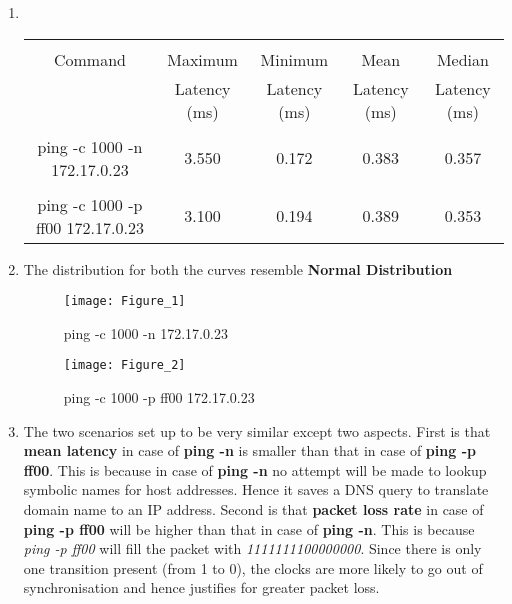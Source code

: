 \documentclass[12pt]{report}
\begin{document}
\begin{enumerate}[label=\textbf{(\alph*)}]
\begin{center}
\begin{tabular}{| c | c | c | c |}
		\end{tabular}
		\\[10pt]
		\end{center}
		\vspace*{2cm}
		\item \textbf{}\\
		\begin{center}
			\begin{tabular}{| c | c | c | c | c |}
				\hline
				&&&&\\[2pt]
				Command & Maximum & Minimum & Mean & Median \\
				&Latency (ms)&Latency (ms)&Latency (ms)&Latency (ms)\\[2pt]
				\hline
				&&&&\\[2pt]
				ping -c 1000 -n 172.17.0.23 & 3.550 & 0.172 & 0.383 & 0.357 \\[2pt]
				\hline
				&&&&\\[2pt]
				ping -c 1000 -p ff00 172.17.0.23 & 3.100 & 0.194 & 0.389 & 0.353 \\[2pt]
				\hline	
			\end{tabular}
		\end{center}
		\pagebreak
		\vspace*{10px}
		\item The distribution for both the curves resemble \textbf{Normal Distribution}\\[1mm]
		\begin{figure}[H]
			\centering
			\texttt{[image: Figure\_1]}
			\caption{ping -c 1000 -n 172.17.0.23}
		\end{figure}
		\begin{figure}[H]
			\centering
			\texttt{[image: Figure\_2]}
			\caption{ping -c 1000 -p ff00 172.17.0.23}
		\end{figure}
		\item The two scenarios set up to be very similar except two aspects. First is that \textbf{mean latency} in case of \textbf{ping -n} is smaller than that in case of \textbf{ping -p ff00}. This is because in case of \textbf{ping -n} no attempt will be made to lookup symbolic names for host addresses. Hence it saves a DNS query to translate domain name to an IP address. Second is that \textbf{packet loss rate} in case of \textbf{ping -p ff00} will be higher than that in case of \textbf{ping -n}. This is because \textit{ping -p ff00} will fill the packet with \textit{1111111100000000}. Since there is only one transition present (from 1 to 0), the clocks are more likely to go out of synchronisation and hence justifies for greater packet loss. 
	\end{enumerate}
	
\end{document}
